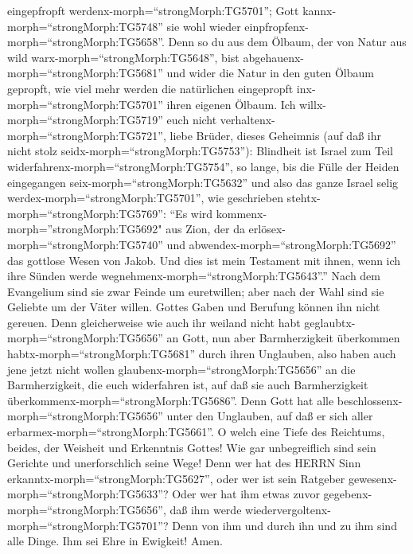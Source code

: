 eingepfropft werdenx-morph=``strongMorph:TG5701''; Gott
kannx-morph=``strongMorph:TG5748'' sie wohl wieder
einpfropfenx-morph=``strongMorph:TG5658''.  Denn so du aus
dem Ölbaum, der von Natur aus wild warx-morph=``strongMorph:TG5648'',
bist abgehauenx-morph=``strongMorph:TG5681'' und wider die Natur in den
guten Ölbaum gepropft, wie viel mehr werden die natürlichen eingepropft
inx-morph=``strongMorph:TG5701'' ihren eigenen Ölbaum.  Ich
willx-morph=``strongMorph:TG5719'' euch nicht
verhaltenx-morph=``strongMorph:TG5721'', liebe Brüder, dieses Geheimnis
(auf daß ihr nicht stolz seidx-morph=``strongMorph:TG5753''): Blindheit
ist Israel zum Teil widerfahrenx-morph=``strongMorph:TG5754'', so lange,
bis die Fülle der Heiden eingegangen seix-morph=``strongMorph:TG5632''
 und also das ganze Israel selig
werdex-morph=``strongMorph:TG5701'', wie geschrieben
stehtx-morph=``strongMorph:TG5769'': ``Es wird
kommenx-morph=''strongMorph:TG5692" aus Zion, der da
erlösex-morph=``strongMorph:TG5740'' und
abwendex-morph=``strongMorph:TG5692'' das gottlose Wesen von Jakob.
 Und dies ist mein Testament mit ihnen, wenn ich ihre
Sünden werde wegnehmenx-morph=``strongMorph:TG5643''.'' 
Nach dem Evangelium sind sie zwar Feinde um euretwillen; aber nach der
Wahl sind sie Geliebte um der Väter willen.  Gottes Gaben
und Berufung können ihn nicht gereuen.  Denn gleicherweise
wie auch ihr weiland nicht habt geglaubtx-morph=``strongMorph:TG5656''
an Gott, nun aber Barmherzigkeit überkommen
habtx-morph=``strongMorph:TG5681'' durch ihren Unglauben, 
also haben auch jene jetzt nicht wollen
glaubenx-morph=``strongMorph:TG5656'' an die Barmherzigkeit, die euch
widerfahren ist, auf daß sie auch Barmherzigkeit
überkommenx-morph=``strongMorph:TG5686''.  Denn Gott hat
alle beschlossenx-morph=``strongMorph:TG5656'' unter den Unglauben, auf
daß er sich aller erbarmex-morph=``strongMorph:TG5661''.  O
welch eine Tiefe des Reichtums, beides, der Weisheit und Erkenntnis
Gottes! Wie gar unbegreiflich sind sein Gerichte und unerforschlich
seine Wege!  Denn wer hat des HERRN Sinn
erkanntx-morph=``strongMorph:TG5627'', oder wer ist sein Ratgeber
gewesenx-morph=``strongMorph:TG5633''?  Oder wer hat ihm
etwas zuvor gegebenx-morph=``strongMorph:TG5656'', daß ihm werde
wiedervergoltenx-morph=``strongMorph:TG5701''?  Denn von
ihm und durch ihn und zu ihm sind alle Dinge. Ihm sei Ehre in Ewigkeit!
Amen.

